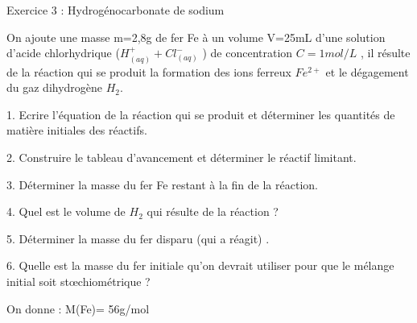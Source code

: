 \documentclass[12pt, french]{article}
\begin{document}

\begin{Box2}{Exercice 3 : Hydrogénocarbonate de sodium}
 
On ajoute une masse m=2,8g  de fer Fe à un volume V=25mL d’une solution d’acide chlorhydrique
($H^+_{(aq)} + Cl^-_{(aq)}$ ) de concentration $C=1mol/L$ , il résulte de la réaction qui se produit la formation des ions ferreux $Fe^{2+}$ et le dégagement du gaz dihydrogène $H_2$.

1. Ecrire l’équation de la réaction qui se produit et déterminer les quantités de matière initiales des réactifs.

2. Construire le tableau d’avancement et déterminer le réactif limitant.

3. Déterminer la masse du fer Fe restant à la fin de la réaction.

4. Quel est le volume de $H_2$ qui résulte de la réaction ?

   5. Déterminer la masse du fer disparu (qui a réagit) .

   6. Quelle est la masse du fer initiale qu’on devrait utiliser pour que le mélange initial soit stœchiométrique ?

On donne : M(Fe)= 56g/mol

\end{Box2}
\end{document}
